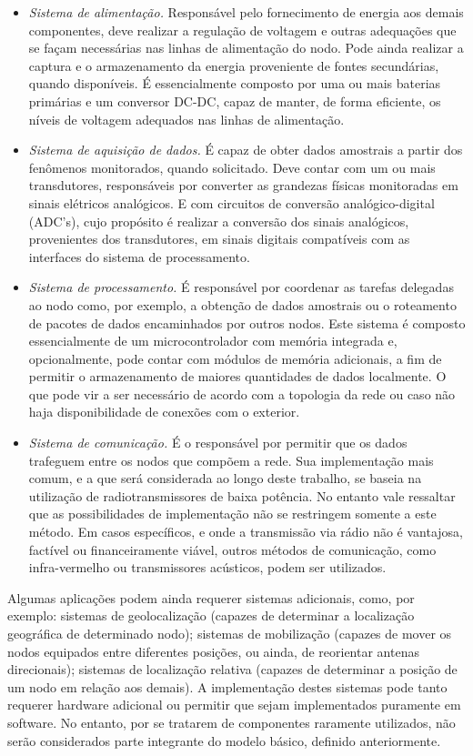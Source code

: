 \documentclass[
	12pt,				%
	openright,			%
	oneside,
	a4paper,			%
	english,			%
	french,				%
	spanish,			%
	brazil				%
	]{abntex2}
\begin{document}
\begin{itemize}
	\item \textit{Sistema de alimentação.} Responsável pelo fornecimento de energia aos demais componentes, deve realizar a regulação de voltagem e outras adequações que se façam necessárias nas linhas de alimentação do nodo. Pode ainda realizar a captura e o armazenamento da energia proveniente de fontes secundárias, quando disponíveis. É essencialmente composto por uma ou mais baterias primárias e um conversor DC-DC, capaz de manter, de forma eficiente, os níveis de voltagem adequados nas linhas de alimentação.
	\item \textit{Sistema de aquisição de dados.} É capaz de obter dados amostrais a partir dos fenômenos monitorados, quando solicitado. Deve contar com um ou mais transdutores, responsáveis por converter as grandezas físicas monitoradas em sinais elétricos analógicos. E com circuitos de conversão analógico-digital (ADC's), cujo propósito é realizar a conversão dos sinais analógicos, provenientes dos transdutores, em sinais digitais compatíveis com as interfaces do sistema de processamento.
	\item \textit{Sistema de processamento.} É responsável por coordenar as tarefas delegadas ao nodo como, por exemplo, a obtenção de dados amostrais ou o roteamento de pacotes de dados encaminhados por outros nodos. Este sistema é composto essencialmente de um microcontrolador com memória integrada e, opcionalmente, pode contar com módulos de memória adicionais, a fim de permitir o armazenamento de maiores quantidades de dados localmente. O que pode vir a ser necessário de acordo com a topologia da rede ou caso não haja disponibilidade de conexões com o exterior.
	\item \textit{Sistema de comunicação.} É o responsável por permitir que os dados trafeguem entre os nodos que compõem a rede. Sua implementação mais comum, e a que será considerada ao longo deste trabalho, se baseia na utilização de radiotransmissores de baixa potência. No entanto vale ressaltar que as possibilidades de implementação não se restringem somente a este método. Em casos específicos, e onde a transmissão via rádio não é vantajosa, factível ou financeiramente viável, outros métodos de comunicação, como infra-vermelho ou transmissores acústicos, podem ser utilizados.
\end{itemize}

Algumas aplicações podem ainda requerer sistemas adicionais, como, por exemplo: sistemas de geolocalização (capazes de determinar a localização geográfica de determinado nodo); sistemas de mobilização (capazes de mover os nodos equipados entre diferentes posições, ou ainda, de reorientar antenas direcionais); sistemas de localização relativa (capazes de determinar a posição de um nodo em relação aos demais). A implementação destes sistemas pode tanto requerer hardware adicional ou permitir que sejam implementados puramente em software. No entanto, por se tratarem de componentes raramente utilizados, não serão considerados parte integrante do modelo básico, definido anteriormente.
\end{document}
